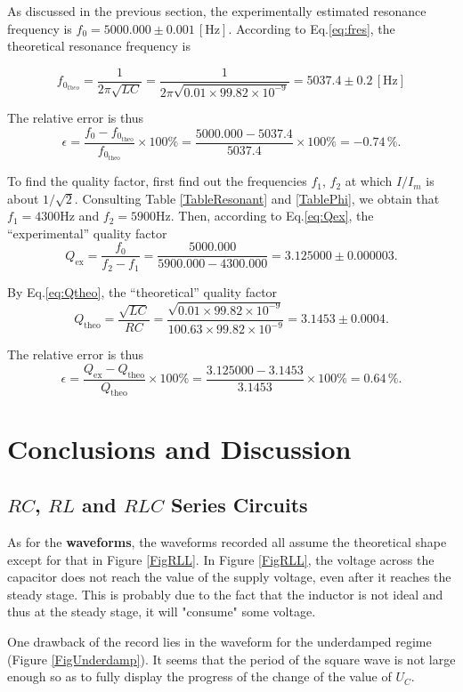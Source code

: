 \documentclass{article}
\begin{document}
As discussed in the previous section, the experimentally estimated resonance frequency is $f_0 = 5000.000\pm 0.001\,[\text{Hz}]$. According to Eq.\eqref{eq:fres}, the theoretical resonance frequency is

$$f_{0_{theo}} = \frac{1}{2\pi\sqrt{LC}} = \frac{1}{2\pi \sqrt{0.01\times 99.82\times 10^{-9}}} = 5037.4\pm 0.2\,[\text{Hz}]$$

The relative error is thus
$$\epsilon = \frac{f_0 - f_{0_{\text{theo}}}}{f_{0_{\text{theo}}}} \times 100\% = \frac{5000.000 - 5037.4}{5037.4} \times 100\% = -0.74\,\%.$$

To find the quality factor, first find out the frequencies $f_1$, $f_2$ at which $I/I_m$ is about $1/\sqrt{2}$. Consulting Table \ref{TableResonant} and \ref{TablePhi}, we obtain that $f_1 = 4300 \text{Hz}$ and $f_2 = 5900 \text{Hz}$. Then, according to Eq.\eqref{eq:Qex}, the ``experimental'' quality factor
$$Q_{\text{ex}} = \frac{f_0}{f_2 - f_1} = \frac{5000.000}{5900.000-4300.000} = 3.125000 \pm 0.000003.$$


By Eq.\eqref{eq:Qtheo}, the ``theoretical'' quality factor
$$Q_{\text{theo}} = \frac{\sqrt{LC}}{RC} = \frac{\sqrt{0.01\times 99.82\times 10^{-9}}}{100.63\times 99.82\times 10^{-9}} = 3.1453 \pm 0.0004.$$

The relative error is thus
$$\epsilon = \frac{Q_{\text{ex}} - Q_{\text{theo}}}{Q_{\text{theo}}} \times 100\% = \frac{3.125000 - 3.1453}{3.1453} \times 100\% = 0.64\,\%.$$

\section{Conclusions and Discussion}

\subsection{$RC$, $RL$ and $RLC$ Series Circuits}

As for the \textbf{waveforms}, the waveforms recorded all assume the theoretical shape except for that in Figure \ref{FigRLL}. In Figure \ref{FigRLL}, the voltage across the capacitor does not reach the value of the supply voltage, even after it reaches the steady stage. This is probably due to the fact that the inductor is not ideal and thus at the steady stage, it will "consume" some voltage.

One drawback of the record lies in the waveform for the underdamped regime (Figure \ref{FigUnderdamp}). It seems that the period of the square wave is not large enough so as to fully display the progress of the change of the value of $U_C$.
\end{document}
